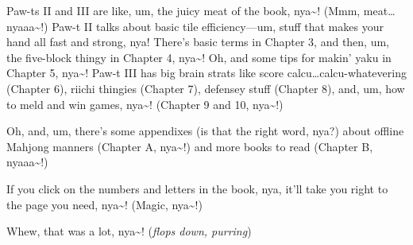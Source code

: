 Paw-ts II and III are like, um, the juicy meat of the book, nya\textasciitilde! (Mmm,
meat… nyaaa\textasciitilde!) Paw-t II talks about basic tile efficiency—um, stuff that makes
your hand all fast and strong, nya! There’s basic terms in Chapter 3, and then,
um, the five-block thingy in Chapter 4, nya\textasciitilde! Oh, and some tips for makin’ yaku
in Chapter 5, nya\textasciitilde! Paw-t III has big brain strats like score
calcu…calcu-whatevering (Chapter 6), riichi thingies (Chapter 7), defensey
stuff (Chapter 8), and, um, how to meld and win games, nya\textasciitilde! (Chapter 9 and 10,
nya\textasciitilde!)

Oh, and, um, there’s some appendixes (is that the right word, nya?) about
offline Mahjong manners (Chapter A, nya\textasciitilde!) and more books to read (Chapter B,
nyaaa\textasciitilde!)

If you click on the numbers and letters in the book, nya, it’ll take you
right to the page you need, nya\textasciitilde! (Magic, nya\textasciitilde!)

Whew, that was a lot, nya\textasciitilde! (\textit{flops down, purring})




